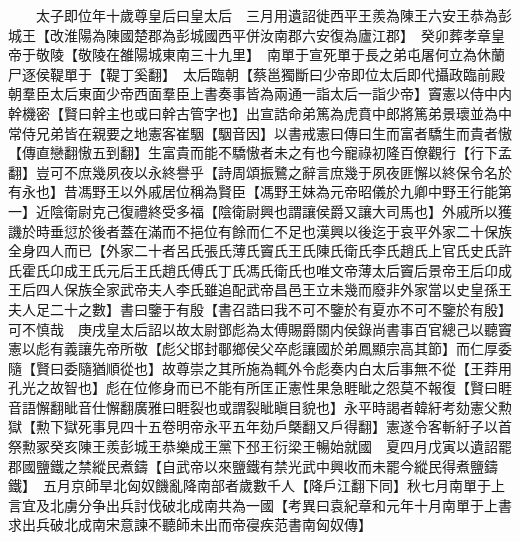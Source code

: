 　　太子即位年十歲尊皇后曰皇太后　三月用遺詔徙西平王羨為陳王六安王恭為彭城王【改淮陽為陳國楚郡為彭城國西平併汝南郡六安復為廬江郡】　癸卯葬孝章皇帝于敬陵【敬陵在雒陽城東南三十九里】　南單于宣死單于長之弟屯屠何立為休蘭尸逐侯鞮單于【鞮丁奚翻】　太后臨朝【蔡邕獨斷曰少帝即位太后即代攝政臨前殿朝羣臣太后東面少帝西面羣臣上書奏事皆為兩通一詣太后一詣少帝】竇憲以侍中内幹機密【賢曰幹主也或曰幹古管字也】出宣誥命弟篤為虎賁中郎將篤弟景瓌並為中常侍兄弟皆在親要之地憲客崔駰【駰音因】以書戒憲曰傳曰生而富者驕生而貴者慠【傳直戀翻慠五到翻】生富貴而能不驕慠者未之有也今寵祿初隆百僚觀行【行下孟翻】豈可不庶幾夙夜以永終譽乎【詩周頌振鷺之辭言庶幾于夙夜匪懈以終保令名於有永也】昔馮野王以外戚居位稱為賢臣【馮野王妹為元帝昭儀於九卿中野王行能第一】近陰衛尉克己復禮終受多福【陰衛尉興也謂讓侯爵又讓大司馬也】外戚所以獲譏於時垂愆於後者蓋在滿而不挹位有餘而仁不足也漢興以後迄于哀平外家二十保族全身四人而已【外家二十者呂氏張氏薄氏竇氏王氏陳氏衛氏李氏趙氏上官氏史氏許氏霍氏卬成王氏元后王氏趙氏傅氏丁氏馮氏衛氏也唯文帝薄太后竇后景帝王后卬成王后四人保族全家武帝夫人李氏雖追配武帝昌邑王立未幾而廢非外家當以史皇孫王夫人足二十之數】書曰鑒于有殷【書召誥曰我不可不鑒於有夏亦不可不鑒於有殷】可不慎哉　庚戌皇太后詔以故太尉鄧彪為太傅賜爵關内侯錄尚書事百官總己以聽竇憲以彪有義讓先帝所敬【彪父邯封鄳鄉侯父卒彪讓國於弟鳳顯宗高其節】而仁厚委隨【賢曰委隨猶順從也】故尊崇之其所施為輒外令彪奏内白太后事無不從【王莽用孔光之故智也】彪在位修身而已不能有所匡正憲性果急睚眦之怨莫不報復【賢曰睚音語懈翻眦音仕懈翻廣雅曰睚裂也或謂裂眦瞋目貌也】永平時謁者韓紆考劾憲父勲獄【勲下獄死事見四十五卷明帝永平五年劾戶槩翻又戶得翻】憲遂令客斬紆子以首祭勲冢癸亥陳王羨彭城王恭樂成王黨下邳王衍梁王暢始就國　夏四月戊寅以遺詔罷郡國鹽鐵之禁縱民煮鑄【自武帝以來鹽鐵有禁光武中興收而未罷今縱民得煮鹽鑄鐵】　五月京師旱北匈奴饑亂降南部者歲數千人【降戶江翻下同】秋七月南單于上言宜及北虜分争出兵討伐破北成南共為一國【考異曰袁紀章和元年十月南單于上書求出兵破北成南宋意諫不聽師未出而帝寑疾范書南匈奴傳】

